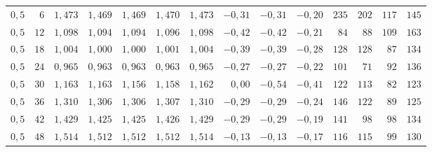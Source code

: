 \documentclass[11pt,a4paper]{article}
\numberwithin{equation}{section}
\begin{document}
\begin{table}[htbp]
\begin{tabular}{rrrrrrrrrrrrrr}
$0{,}5$ & $6$ & $1{,}473$ & $1{,}469$ & $1{,}469$ & $1{,}470$ & $1{,}473$ & $-0{,}31$ & $-0{,}31$ & $-0{,}20$ & $235$ & $202$ & $117$ & $145$ \\
$0{,}5$ & $12$ & $1{,}098$ & $1{,}094$ & $1{,}094$ & $1{,}096$ & $1{,}098$ & $-0{,}42$ & $-0{,}42$ & $-0{,}21$ & $84$ & $88$ & $109$ & $163$ \\
$0{,}5$ & $18$ & $1{,}004$ & $1{,}000$ & $1{,}000$ & $1{,}001$ & $1{,}004$ & $-0{,}39$ & $-0{,}39$ & $-0{,}28$ & $128$ & $128$ & $87$ & $134$ \\
$0{,}5$ & $24$ & $0{,}965$ & $0{,}963$ & $0{,}963$ & $0{,}963$ & $0{,}965$ & $-0{,}27$ & $-0{,}27$ & $-0{,}22$ & $101$ & $71$ & $92$ & $136$ \\
$0{,}5$ & $30$ & $1{,}163$ & $1{,}163$ & $1{,}156$ & $1{,}158$ & $1{,}162$ & $0{,}00$ & $-0{,}54$ & $-0{,}41$ & $122$ & $113$ & $82$ & $123$ \\
$0{,}5$ & $36$ & $1{,}310$ & $1{,}306$ & $1{,}306$ & $1{,}307$ & $1{,}310$ & $-0{,}29$ & $-0{,}29$ & $-0{,}24$ & $146$ & $122$ & $89$ & $125$ \\
$0{,}5$ & $42$ & $1{,}429$ & $1{,}425$ & $1{,}425$ & $1{,}426$ & $1{,}429$ & $-0{,}29$ & $-0{,}29$ & $-0{,}19$ & $141$ & $98$ & $98$ & $134$ \\
$0{,}5$ & $48$ & $1{,}514$ & $1{,}512$ & $1{,}512$ & $1{,}512$ & $1{,}514$ & $-0{,}13$ & $-0{,}13$ & $-0{,}17$ & $116$ & $115$ & $99$ & $130$ \\
\bottomrule
\end{tabular}
\end{table}
\end{document}
